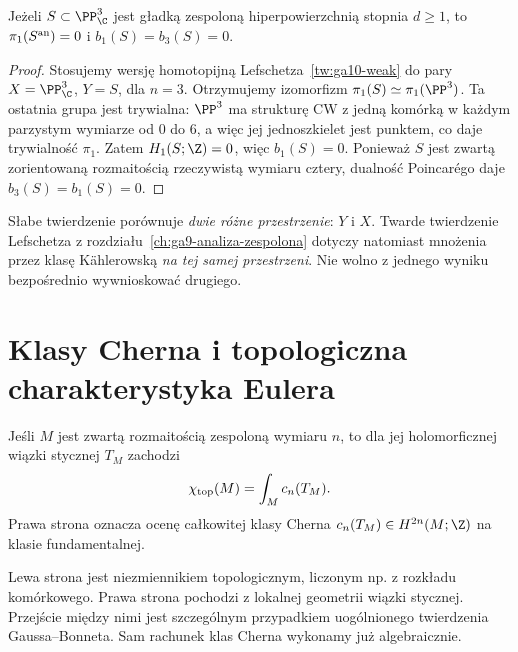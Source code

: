 \begin{stwierdzenie}
\label{st:ga10-simplyconn}
Jeżeli $S\subset\PP^3_\C$ jest gładką zespoloną
hiperpowierzchnią stopnia $d\ge1$, to
$\pi_1(S^{\rm an})=0$ i $b_1(S)=b_3(S)=0$.
\end{stwierdzenie}
\begin{proof}
Stosujemy wersję homotopijną
Lefschetza~\ref{tw:ga10-weak} do pary
$X=\PP^3_\C$, $Y=S$, dla $n=3$.
Otrzymujemy izomorfizm $\pi_1(S)\simeq\pi_1(\PP^3)$.
Ta ostatnia grupa jest trywialna: $\PP^3$ ma strukturę
CW z jedną komórką w każdym parzystym wymiarze od $0$ do $6$,
a więc jej jednoszkielet jest punktem, co daje trywialność
$\pi_1$. Zatem $H_1(S;\Z)=0$, więc $b_1(S)=0$.
Ponieważ $S$ jest zwartą zorientowaną rozmaitością
rzeczywistą wymiaru cztery, dualność Poincarégo daje
$b_3(S)=b_1(S)=0$.
\end{proof}

\begin{uwaga}
Słabe twierdzenie porównuje \emph{dwie różne przestrzenie}:
$Y$ i $X$. Twarde twierdzenie Lefschetza z
rozdziału~\ref{ch:ga9-analiza-zespolona} dotyczy natomiast
mnożenia przez klasę Kählerowską \emph{na tej samej przestrzeni}.
Nie wolno z jednego wyniku bezpośrednio wywnioskować drugiego.
\end{uwaga}

\section{Klasy Cherna i topologiczna charakterystyka Eulera}
\label{sec:ga10-chern-euler}

\begin{twierdzenie}
\label{tw:ga10-cgb}
Jeśli $M$ jest zwartą rozmaitością zespoloną wymiaru $n$,
to dla jej holomorficznej wiązki stycznej $T_M$ zachodzi
\[
 \chi_{\rm top}(M)=\int_M c_n(T_M).
\]
Prawa strona oznacza ocenę całkowitej klasy Cherna
$c_n(T_M)\in H^{2n}(M;\Z)$ na klasie fundamentalnej.
\end{twierdzenie}

\begin{uwaga}
Lewa strona jest niezmiennikiem topologicznym,
liczonym np. z rozkładu komórkowego. Prawa strona
pochodzi z lokalnej geometrii wiązki stycznej.
Przejście między nimi jest szczególnym przypadkiem
uogólnionego twierdzenia Gaussa--Bonneta.
Sam rachunek klas Cherna wykonamy już algebraicznie.
\end{uwaga}

